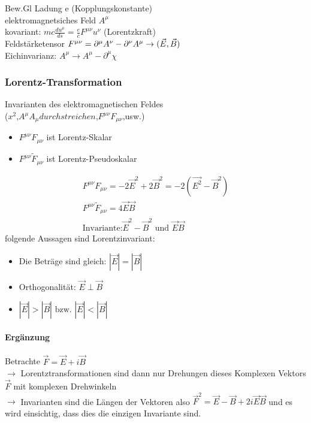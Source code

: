 \documentclass[a4paper]{article}
\begin{document}
Bew.Gl
Ladung e (Kopplungskonstante)\\
elektromagnetsiches Feld $A^\mu$\\
kovariant: $mc\frac{du^\mu}{ds}=\frac{e}{c} F^{\mu\nu} u^\nu$ (Lorentzkraft)\\
Feldstärketensor $F^{\mu\nu}=\partial^\mu A^\nu-\partial^\nu A^\mu \\
\rightarrow (\vec{E},\vec{B})$\\
Eichinvarianz: $A^\mu\rightarrow A^\mu-\partial^\mu\chi$\\
\subsubsection{Lorentz-Transformation}
Invarianten des elektromagnetischen Feldes\\
($x^2$,$A^\mu A_\mu durchstreichen$,$F^{\mu\nu}F_{\mu\nu}$,usw.)\\
\begin{itemize}
  \item $F^{\mu\nu}F_{\mu\nu}$ ist Lorentz-Skalar
  \item $F^{\mu\nu}\tilde{F}_{\mu\nu}$ ist Lorentz-Pseudoskalar
\end{itemize}
\begin{align}
F^{\mu\nu}F_{\mu\nu}=-2\vec{E}^2+2\vec{B}^2=-2(\vec{E^2}-\vec{B}^2)\\
F^{\mu\nu}\tilde{F}_{\mu\nu}=4\vec{E}\vec{B}\\
\text{Invariante:} \vec{E}^2-\vec{B}^2 \text{ und } \vec{E}\vec{B}
\end{align}
folgende Aussagen sind Lorentzinvariant:
\begin{itemize}
  \item Die Beträge sind gleich: $|\vec{E}|=|\vec{B}|$
  \item Orthogonalität: $\vec{E} \perp \vec{B}$
  \item $|\vec{E}|>|\vec{B}| \text{ bzw. } |\vec{E}|<|\vec{B}|$
\end{itemize}
\paragraph{Ergänzung}
Betrachte $\vec{F}=\vec{E}+i\vec{B}$\\
$\rightarrow$ Lorentztransformationen sind dann nur Drehungen dieses Komplexen
Vektors $\vec{F}$ mit komplexen Drehwinkeln\\
$\rightarrow$ Invarianten sind die Längen der Vektoren also
$\vec{F}^2=\vec{E}-\vec{B}+2i\vec{E}\vec{B}$ und es wird einsichtig, dass dies
die einzigen Invariante sind.
\end{document}
